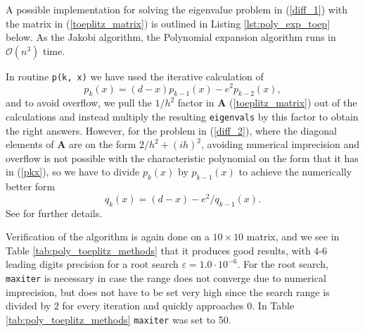 \documentclass[]{article}
\begin{document}
A possible implementation for solving the eigenvalue problem in (\ref{diff_1}) with the matrix in (\ref{toeplitz_matrix}) is outlined in Listing \ref{lst:poly_exp_toep} below. As the Jakobi algorithm, the Polynomial expansion algorithm runs in $\mathcal{O}(n^3)$ time.

In routine \lstinline|p(k, x)| we have used the iterative calculation of 
\begin{equation}
\label{pkx}
p_k(x) = (d-x)p_{k-1}(x) - e^2p_{k-2}(x),
\end{equation}
and to avoid overflow, we pull the $1/h^2$ factor in $\mathbf{A}$ (\ref{toeplitz_matrix}) out of the calculations and instead multiply the resulting \lstinline|eigenvals| by this factor to obtain the right answers. However, for the problem in (\ref{diff_2}), where the diagonal elements of $\mathbf{A}$ are on the form $2/h^2 + (ih)^2$, avoiding numerical imprecision and overflow is not possible with the characteristic polynomial on the form that it has in (\ref{pkx}), so we have to divide $p_k(x)$ by $p_{k-1}(x)$ to achieve the numerically better form 
\begin{equation}
\label{qkx}
q_k(x) = (d-x) - e^2/q_{k-1}(x).
\end{equation}
See \cite{barth1967calculation} for further details.

Verification of the algorithm is again done on a $10 \times 10$ matrix, and we see in Table \ref{tab:poly_toeplitz_methods} that it produces good results, with $4$-$6$ leading digits precision for a root search $\varepsilon = 1.0 \cdot 10^{-6}$. For the root search, \lstinline|maxiter| is necessary in case the range does not converge due to numerical imprecision, but does not have to be set very high since the search range is divided by $2$ for every iteration and quickly approaches $0$. In Table \ref{tab:poly_toeplitz_methods} \lstinline|maxiter| was set to 50.
\end{document}
